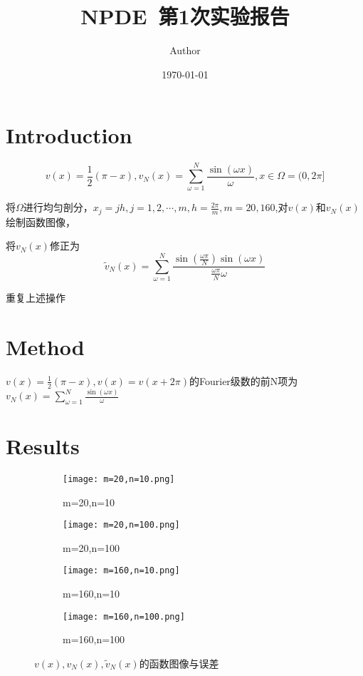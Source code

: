\documentclass{article}
\title{NPDE~第1次实验报告}
\author{Author}
\date{\today}
\begin{document}
\maketitle

\section{Introduction}

$$v(x)=\frac{1}{2}(\pi-x),v_N(x)=\sum_{\omega =1}^{N}\frac{\sin(\omega x)}{\omega},x \in \Omega=(0,2\pi]$$

将$\Omega$进行均匀剖分，$x_j=jh,j=1,2,\cdots,m,h=\frac{2\pi}{m},m=20,160$,对$v(x)$和$v_N(x)$绘制函数图像，

将$v_N(x)$修正为$$\widetilde{v}_N(x)=\sum_{\omega =1}^{N}\frac{\sin(\frac{\omega \pi}{N})\sin(\omega x)}{\frac{\omega \pi}{N}\omega} $$

重复上述操作

\section{Method}

$v(x)=\frac{1}{2}(\pi-x),v(x)=v(x+2\pi)$的Fourier级数的前N项为$v_N(x)=\sum_{\omega =1}^{N}\frac{\sin(\omega x)}{\omega}$


\section{Results}

\begin{figure}[H]
    \centering
    \begin{subfigure}{0.35\textwidth}
        \texttt{[image: m=20,n=10.png]}
        \caption{m=20,n=10}        
    \end{subfigure}
    \begin{subfigure}{0.35\textwidth}
        \texttt{[image: m=20,n=100.png]}
        \caption{m=20,n=100}
    \end{subfigure}
    \begin{subfigure}{0.35\textwidth}
        \texttt{[image: m=160,n=10.png]}
        \caption{m=160,n=10}
    \end{subfigure}
    \begin{subfigure}{0.35\textwidth}
        \texttt{[image: m=160,n=100.png]}
        \caption{m=160,n=100}
    \end{subfigure}
    \caption{$v(x),v_N(x),\widetilde{v}_N(x)$的函数图像与误差}
\end{figure}
\end{document}
